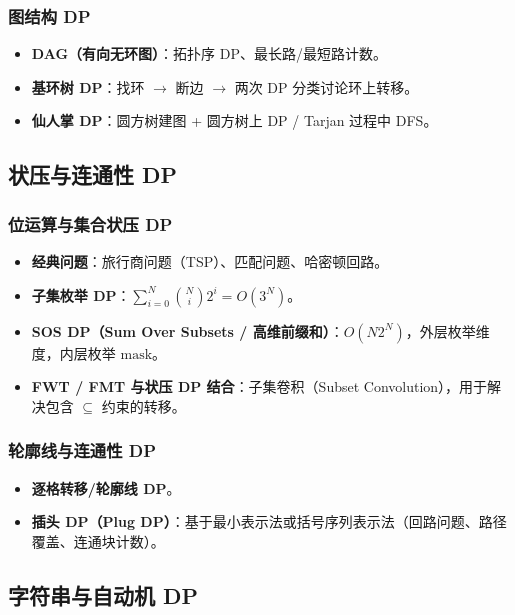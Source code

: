 \subsubsection{图结构 DP}
\begin{itemize}
    \item \textbf{DAG（有向无环图）}：拓扑序 DP、最长路/最短路计数。
    \item \textbf{基环树 DP}：找环 $\to$ 断边 $\to$ 两次 DP 分类讨论环上转移。
    \item \textbf{仙人掌 DP}：圆方树建图 + 圆方树上 DP / Tarjan 过程中 DFS。
\end{itemize}


\subsection{状压与连通性 DP}

\subsubsection{位运算与集合状压 DP}
\begin{itemize}
    \item \textbf{经典问题}：旅行商问题（TSP）、匹配问题、哈密顿回路。
    \item \textbf{子集枚举 DP}：$\sum_{i=0}^N \binom{N}{i} 2^i = O(3^N)$。
    \item \textbf{SOS DP（Sum Over Subsets / 高维前缀和）}：$O(N 2^N)$，外层枚举维度，内层枚举 $\mathrm{mask}$。
    \item \textbf{FWT / FMT 与状压 DP 结合}：子集卷积（Subset Convolution），用于解决包含 $\subseteq$ 约束的转移。
\end{itemize}

\subsubsection{轮廓线与连通性 DP}
\begin{itemize}
    \item \textbf{逐格转移/轮廓线 DP}。
    \item \textbf{插头 DP（Plug DP）}：基于最小表示法或括号序列表示法（回路问题、路径覆盖、连通块计数）。
\end{itemize}


\subsection{字符串与自动机 DP}

